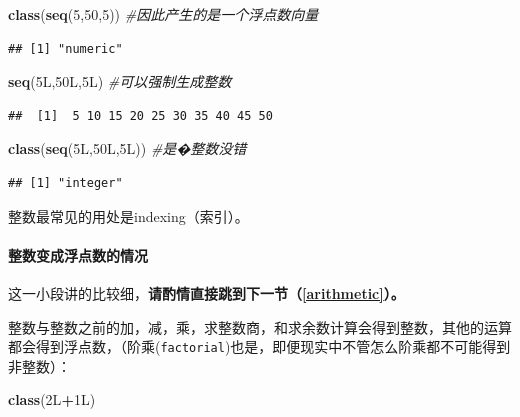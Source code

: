 \documentclass[]{book}
\newenvironment{Shaded}{\begin{snugshade}}{\end{snugshade}}
\newcommand{\CommentTok}[1]{\textcolor[rgb]{0.56,0.35,0.01}{\textit{#1}}}
\newcommand{\DecValTok}[1]{\textcolor[rgb]{0.00,0.00,0.81}{#1}}
\newcommand{\KeywordTok}[1]{\textcolor[rgb]{0.13,0.29,0.53}{\textbf{#1}}}
\newcommand{\NormalTok}[1]{#1}
\newcommand{\OperatorTok}[1]{\textcolor[rgb]{0.81,0.36,0.00}{\textbf{#1}}}
\let\oldparagraph\paragraph
\renewcommand{\paragraph}[1]{\oldparagraph{#1}\mbox{}}
\begin{document}
\begin{Shaded}
\begin{Highlighting}[]
\KeywordTok{class}\NormalTok{(}\KeywordTok{seq}\NormalTok{(}\DecValTok{5}\NormalTok{,}\DecValTok{50}\NormalTok{,}\DecValTok{5}\NormalTok{)) }\CommentTok{#因此产生的是一个浮点数向量}
\end{Highlighting}
\end{Shaded}

\begin{verbatim}
## [1] "numeric"
\end{verbatim}

\begin{Shaded}
\begin{Highlighting}[]
\KeywordTok{seq}\NormalTok{(5L,50L,5L) }\CommentTok{#可以强制生成整数}
\end{Highlighting}
\end{Shaded}

\begin{verbatim}
##  [1]  5 10 15 20 25 30 35 40 45 50
\end{verbatim}

\begin{Shaded}
\begin{Highlighting}[]
\KeywordTok{class}\NormalTok{(}\KeywordTok{seq}\NormalTok{(5L,50L,5L)) }\CommentTok{#是�整数没错}
\end{Highlighting}
\end{Shaded}

\begin{verbatim}
## [1] "integer"
\end{verbatim}

整数最常见的用处是indexing（索引）。

\paragraph{整数变成浮点数的情况}

这一小段讲的比较细，\textbf{请酌情直接跳到下一节（\ref{arithmetic}）。}

整数与整数之前的加，减，乘，求整数商，和求余数计算会得到整数，其他的运算都会得到浮点数，（阶乘(\texttt{factorial})也是，即便现实中不管怎么阶乘都不可能得到非整数）：

\begin{Shaded}
\begin{Highlighting}[]
\KeywordTok{class}\NormalTok{(2L}\OperatorTok{+}\NormalTok{1L)}
\end{Highlighting}
\end{Shaded}
\end{document}
